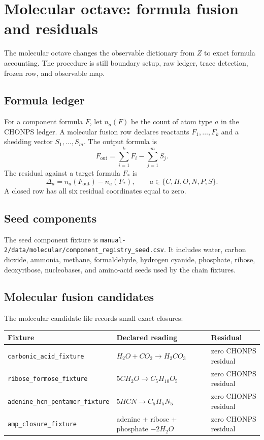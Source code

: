 \section{Molecular octave: formula fusion and residuals}

The molecular octave changes the observable dictionary from $Z$ to exact formula accounting. The procedure is still boundary setup, raw ledger, trace detection, frozen row, and observable map.

\subsection{Formula ledger}

For a component formula $F$, let $n_a(F)$ be the count of atom type $a$ in the CHONPS ledger. A molecular fusion row declares reactants $F_1,\ldots,F_k$ and a shedding vector $S_1,\ldots,S_m$. The output formula is
\[
F_{\mathrm{out}}=\sum_{i=1}^{k}F_i-\sum_{j=1}^{m}S_j.
\]
The residual against a target formula $F_*$ is
\[
\Delta_a=n_a(F_{\mathrm{out}})-n_a(F_*),
\qquad a\in\{C,H,O,N,P,S\}.
\]
A closed row has all six residual coordinates equal to zero.

\subsection{Seed components}

The seed component fixture is \texttt{manual-2/data/molecular/component\_registry\_seed.csv}. It includes water, carbon dioxide, ammonia, methane, formaldehyde, hydrogen cyanide, phosphate, ribose, deoxyribose, nucleobases, and amino-acid seeds used by the chain fixtures.

\subsection{Molecular fusion candidates}

The molecular candidate file records small exact closures:
\begin{center}
\begin{tabularx}{\linewidth}{@{}lXl@{}}
\toprule
Fixture & Declared reading & Residual \\
\midrule
\texttt{carbonic\_acid\_fixture} & $H_2O+CO_2\to H_2CO_3$ & zero CHONPS residual \\
\texttt{ribose\_formose\_fixture} & $5CH_2O\to C_5H_{10}O_5$ & zero CHONPS residual \\
\texttt{adenine\_hcn\_pentamer\_fixture} & $5HCN\to C_5H_5N_5$ & zero CHONPS residual \\
\texttt{amp\_closure\_fixture} & adenine + ribose + phosphate $-2H_2O$ & zero CHONPS residual \\
\bottomrule
\end{tabularx}
\end{center}

